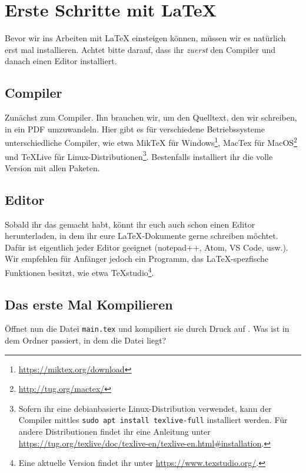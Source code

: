 \chapter{Erste Schritte mit \LaTeX}
Bevor wir ins Arbeiten mit \LaTeX{} einsteigen können, müssen wir es natürlich erst mal installieren. Achtet bitte darauf, dass ihr \emph{zuerst} den Compiler und danach einen Editor installiert.

\section{Compiler}
Zunächst zum Compiler. Ihn brauchen wir, um den Quelltext, den wir schreiben, in ein PDF umzuwandeln. Hier gibt es für verschiedene Betriebssysteme unterschiedliche Compiler, wie etwa MikTeX für Windows\footnote{\url{https://miktex.org/download}}, MacTex für MacOS\footnote{\url{http://tug.org/mactex/}} und TeXLive für Linux-Distributionen\footnote{Sofern ihr eine debianbasierte Linux-Distribution verwendet, kann der Compiler mittles \texttt{sudo apt install texlive-full} installiert werden. Für andere Distributionen findet ihr eine Anleitung unter \url{https://tug.org/texlive/doc/texlive-en/texlive-en.html\#installation}.}. Bestenfalls installiert ihr die volle Version mit allen Paketen.

\section{Editor}
Sobald ihr das gemacht habt, könnt ihr euch auch schon einen Editor herunterladen, in dem ihr eure \LaTeX-Dokumente gerne schreiben möchtet. Dafür ist eigentlich jeder Editor geeignet (notepad++, Atom, VS Code, usw.). Wir empfehlen für Anfänger jedoch ein Programm, das \LaTeX-spezfische Funktionen besitzt, wie etwa TeXstudio\footnote{Eine aktuelle Version findet ihr unter \url{https://www.texstudio.org/}.}.

\section{Das erste Mal Kompilieren}
Öffnet nun die Datei \texttt{main.tex} und kompiliert sie durch Druck auf \faForward. Was ist in dem Ordner passiert, in dem die Datei liegt?
